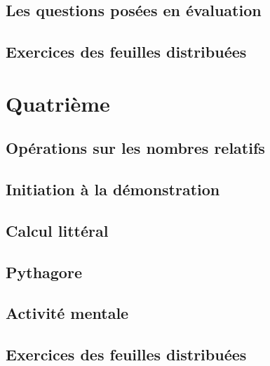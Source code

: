 \documentclass[a4paper,12pt]{book}
\begin{document}
\chapter{Les questions posées en évaluation}


\chapter{Exercices des feuilles distribuées}


\part{Quatrième}

\chapter{Opérations sur les nombres relatifs}


\chapter{Initiation à la démonstration}


\chapter{Calcul littéral}


\chapter{Pythagore}


\chapter{Activité mentale}


\chapter{Exercices des feuilles distribuées}


\end{document}
